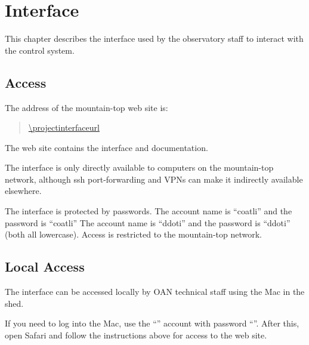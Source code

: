\chapter{Interface}
\label{chapter:interface}

This chapter describes the interface used by the observatory staff to interact with the {\projectname} control system.



\section{Access}

The address of the {\projectname} mountain-top web site is:
\begin{quotation}
\url{\projectinterfaceurl}
\end{quotation}

The web site contains the interface and documentation.

The interface is only directly available to computers on the mountain-top network, although ssh port-forwarding and VPNs can make it indirectly available elsewhere. 

The interface is protected by passwords. 
\ifcoatli
The account name is “coatli” and the password is “coatli”
\fi
\ifddoti
The account name is “ddoti” and the password is “ddoti”
\fi
(both all lowercase). Access is restricted to the mountain-top network.

\section{Local Access}
\label{section:interface-access-mac}

The interface can be accessed locally by OAN technical staff using the Mac in the shed.

If you need to log into the Mac, use the “{\projectaccount}” account with password “{\projectaccount}”. After this, open Safari and follow the instructions above for access to the web site.

